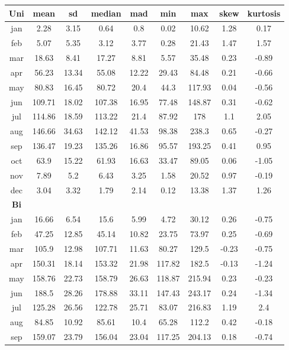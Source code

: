 \documentclass{article}
\begin{document}
\begin{table}
	\centering
	\begin{tabular}{|c|c|c|c|c|c|c|c|c|}
\hline
\textbf{Uni} &mean &  sd& median &mad & min &  max& skew &kurtosis \\
\hline
jan  &  2.28 & 3.15 &  0.64 & 0.8 &0.02 &10.62 & 1.28 & 0.17 \\
\hline
feb  &  5.07& 5.35 &  3.12 & 3.77 &0.28 &21.43& 1.47&1.57 \\
\hline
mar  &  18.63 &8.41  &17.27 & 8.81 &5.57 &35.48& 0.23 &-0.89 \\
\hline
apr & 56.23& 13.34&  55.08  & 12.22& 29.43& 84.48 &0.21 & -0.66 \\
\hline
may  & 80.83& 16.45 &  80.72 &20.4 &44.3 &117.93 &0.04 & -0.56 \\
\hline
jun &109.71 &18.02& 107.38 &16.95 &77.48 &148.87&0.31  &-0.62 \\
\hline
jul & 114.86 &18.59 &113.22 &21.4 &87.92 &178 &  1.1 & 2.05 \\
\hline
aug &146.66& 34.63& 142.12 & 41.53& 98.38 &238.3 & 0.65  &-0.27 \\
\hline
sep &136.47& 19.23 &135.26 & 16.86 &95.57 &193.25&  0.41 &0.95 \\
\hline
oct &63.9& 15.22  &61.93 & 16.63& 33.47 &89.05& 0.06& -1.05  \\
\hline
nov &7.89 &5.2  & 6.43  & 3.25& 1.58 &20.52 &0.97 & -0.19 \\
\hline
dec& 3.04& 3.32 &  1.79  &  2.14 & 0.12& 13.38& 1.37 & 1.26 \\
\hline
\textbf{Bi} & & & & & & & & \\
\hline
jan &16.66 &6.54  & 15.6 &5.99 &4.72& 30.12& 0.26& -0.75 \\
\hline
feb  &47.25 &12.85 & 45.14 & 10.82 &23.75 &73.97&0.25 & -0.69 \\
\hline
mar &105.9 &12.98 &107.71  &11.63 &80.27& 129.5& -0.23 & -0.75 \\
\hline
apr &150.31 &18.14& 153.32 & 21.98 &117.82 &182.5 & -0.13 &-1.24 \\
\hline
may &158.76 &22.73 &158.79  &26.63 &118.87 &215.94& 0.23 &-0.23 \\
\hline
jun &188.5 &28.26 &178.88  &33.11 &147.43& 243.17 & 0.24  &-1.34 \\
\hline
jul &125.28 &26.56& 122.78 & 25.71 &83.07& 216.83 &1.19  &2.4 \\
\hline
aug &84.85 &10.92 & 85.61 &10.4 &65.28 &112.2 & 0.42 & -0.18 \\
\hline
sep &159.07& 23.79& 156.04 & 23.04 &117.25 &204.13&0.18 &-0.74 \\

\end{tabular}
\end{table}
\end{document}
